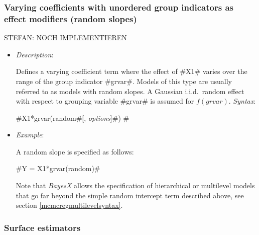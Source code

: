 


\subsubsection*{Varying coefficients with unordered group indicators as effect modifiers
(random slopes)}

STEFAN: NOCH IMPLEMENTIEREN

\begin{itemize}
\item[] {\em Description}:

Defines a varying coefficient term where the effect of #X1# varies
over the range of the group indicator #grvar#. Models of this type
are usually referred to as models with random slopes. A Gaussian
i.i.d.~random effect with respect to grouping variable #grvar# is
assumed for $f(grvar)$.
{\em Syntax}:

#X1*grvar(random#[, {\em options}]#) #
\item[] {\em Example}:

A random slope  is specified as follows:

#Y = X1*grvar(random)#

Note that {\em BayesX} allows the specification of hierarchical or multilevel models that go far beyond
the simple random intercept term described above, see section \autoref{mcmcregmultilevelsyntax}.
\end{itemize}


\subsubsection*{Surface estimators}

